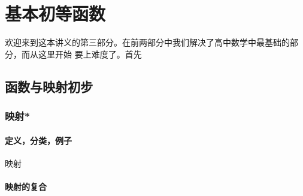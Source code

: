 \part{基本初等函数}
欢迎来到这本讲义的第三部分。在前两部分中我们解决了高中数学中最基础的部分，而从这里开始
要上难度了。首先 
\chapter{函数与映射初步}
\section{映射*}
\subsection{定义，分类，例子}
\begin{definition}
    映射
\end{definition}
\subsection{映射的复合}

\clearpage
